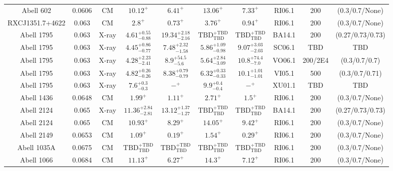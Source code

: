 \begin{table}
\begin{tabular}{cccccccccc}
Abell 602 & 0.0606 & CM & ${10.12}^{+}_{}$ & ${6.41}^{+}_{}$ & ${13.06}^{+}_{}$ & ${7.33}^{+}_{}$ & RI06.1 & 200 & (0.3/0.7/None) \\
RXCJ1351.7+4622 & 0.063 & CM & ${2.8}^{+}_{}$ & ${0.73}^{+}_{}$ & ${3.76}^{+}_{}$ & ${0.94}^{+}_{}$ & RI06.1 & 200 & (0.3/0.7/None) \\
Abell 1795 & 0.063 & X-ray & ${4.61}^{+0.55}_{-0.88}$ & ${19.34}^{+2.18}_{-2.16}$ & ${\mathrm{TBD}}^{+\mathrm{TBD}}_{\mathrm{TBD}}$ & ${\mathrm{TBD}}^{+\mathrm{TBD}}_{\mathrm{TBD}}$ & BA14.1 & 200 & (0.27/0.73/0.73) \\
Abell 1795 & 0.063 & X-ray & ${4.45}^{+0.86}_{-0.77}$ & ${7.48}^{+2.32}_{-1.58}$ & ${5.86}^{+1.09}_{-0.98}$ & ${9.07}^{+3.03}_{-2.03}$ & SC06.1 & TBD & TBD \\
Abell 1795 & 0.063 & X-ray & ${4.28}^{+2.23}_{-2.41}$ & ${8.9}^{+54.5}_{-5.6}$ & ${5.64}^{+2.84}_{-3.09}$ & ${10.8}^{+74.4}_{-7.0}$ & VO06.1 & 200/2E4 & (0.3/0.7/0.7) \\
Abell 1795 & 0.063 & X-ray & ${4.82}^{+0.26}_{-0.26}$ & ${8.38}^{+0.79}_{-0.79}$ & ${6.32}^{+0.33}_{-0.33}$ & ${10.1}^{+1.01}_{-1.01}$ & VI05.1 & 500 & (0.3/0.7/0.71) \\
Abell 1795 & 0.063 & X-ray & ${7.6}^{+0.3}_{-0.3}$ & ${-}^{+}_{}$ & ${9.9}^{+0.4}_{-0.4}$ & ${-}^{+}_{}$ & XU01.1 & TBD & TBD \\
Abell 1436 & 0.0648 & CM & ${1.99}^{+}_{}$ & ${1.11}^{+}_{}$ & ${2.71}^{+}_{}$ & ${1.5}^{+}_{}$ & RI06.1 & 200 & (0.3/0.7/None) \\
Abell 2124 & 0.065 & X-ray & ${11.36}^{+2.84}_{-2.81}$ & ${13.12}^{+1.37}_{-1.27}$ & ${\mathrm{TBD}}^{+\mathrm{TBD}}_{\mathrm{TBD}}$ & ${\mathrm{TBD}}^{+\mathrm{TBD}}_{\mathrm{TBD}}$ & BA14.1 & 200 & (0.27/0.73/0.73) \\
Abell 2124 & 0.065 & CM & ${10.93}^{+}_{}$ & ${8.29}^{+}_{}$ & ${14.05}^{+}_{}$ & ${9.42}^{+}_{}$ & RI06.1 & 200 & (0.3/0.7/None) \\
Abell 2149 & 0.0653 & CM & ${1.09}^{+}_{}$ & ${0.19}^{+}_{}$ & ${1.54}^{+}_{}$ & ${0.29}^{+}_{}$ & RI06.1 & 200 & (0.3/0.7/None) \\
Abell 1035A & 0.0675 & CM & ${\mathrm{TBD}}^{+\mathrm{TBD}}_{\mathrm{TBD}}$ & ${\mathrm{TBD}}^{+\mathrm{TBD}}_{\mathrm{TBD}}$ & ${\mathrm{TBD}}^{+\mathrm{TBD}}_{\mathrm{TBD}}$ & ${\mathrm{TBD}}^{+\mathrm{TBD}}_{\mathrm{TBD}}$ & RI06.1 & 200 & (0.3/0.7/None) \\
Abell 1066 & 0.0684 & CM & ${11.13}^{+}_{}$ & ${6.27}^{+}_{}$ & ${14.3}^{+}_{}$ & ${7.12}^{+}_{}$ & RI06.1 & 200 & (0.3/0.7/None) \\

\end{tabular}
\end{table}
